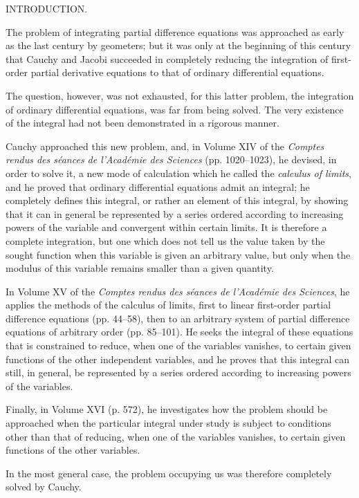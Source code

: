 \documentclass[11pt]{article}
\begin{document}
\begin{center}
{\large INTRODUCTION.}
\end{center}

The problem of integrating partial difference equations was approached as early as the last century by geometers; but it was only at the beginning of this century that Cauchy and Jacobi succeeded in completely reducing the integration of first-order partial derivative equations to that of ordinary differential equations.

The question, however, was not exhausted, for this latter problem, the integration of ordinary differential equations, was far from being solved. The very existence of the integral had not been demonstrated in a rigorous manner.

Cauchy approached this new problem, and, in Volume XIV of the \emph{Comptes rendus des séances de l'Académie des Sciences} (pp. 1020--1023), he devised, in order to solve it, a new mode of calculation which he called the \emph{calculus of limits}, and he proved that ordinary differential equations admit an integral; he completely defines this integral, or rather an element of this integral, by showing that it can in general be represented by a series ordered according to increasing powers of the variable and convergent within certain limits. It is therefore a complete integration, but one which does not tell us the value taken by the sought function when this variable is given an arbitrary value, but only when the modulus of this variable remains smaller than a given quantity.

In Volume XV of the \emph{Comptes rendus des séances de l'Académie des Sciences}, he applies the methods of the calculus of limits, first to linear first-order partial difference equations (pp. 44--58), then to an arbitrary system of partial difference equations of arbitrary order (pp. 85--101). He seeks the integral of these equations that is constrained to reduce, when one of the variables vanishes, to certain given functions of the other independent variables, and he proves that this integral can still, in general, be represented by a series ordered according to increasing powers of the variables.

Finally, in Volume XVI (p. 572), he investigates how the problem should be approached when the particular integral under study is subject to conditions other than that of reducing, when one of the variables vanishes, to certain given functions of the other variables.

In the most general case, the problem occupying us was therefore completely solved by Cauchy.
\end{document}
